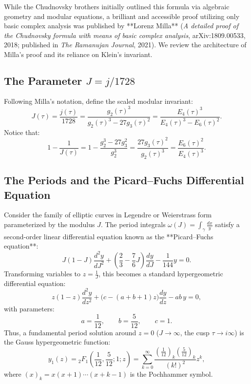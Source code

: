 \documentclass[a4paper]{article}
\begin{document}
While the Chudnovsky brothers initially outlined this formula via algebraic geometry and modular equations, a brilliant and accessible proof utilizing only basic complex analysis was published by **Lorenz Milla** (\emph{A detailed proof of the Chudnovsky formula with means of basic complex analysis}, arXiv:1809.00533, 2018; published in \emph{The Ramanujan Journal}, 2021). We review the architecture of Milla's proof and its reliance on Klein's invariant.

\subsection{The Parameter \texorpdfstring{$J = j/1728$}{J = j/1728}}
Following Milla's notation, define the scaled modular invariant:
\begin{equation}
 J(\tau) = \frac{j(\tau)}{1728} = \frac{g_2(\tau)^3}{g_2(\tau)^3 - 27g_3(\tau)^2} = \frac{E_4(\tau)^3}{E_4(\tau)^3 - E_6(\tau)^2}.
\end{equation}
Notice that:
\begin{equation}
 1 - \frac{1}{J(\tau)} = 1 - \frac{g_2^3 - 27g_3^2}{g_2^3} = \frac{27 g_3(\tau)^2}{g_2(\tau)^3} = \frac{E_6(\tau)^2}{E_4(\tau)^3}.
\end{equation}

\subsection{The Periods and the Picard--Fuchs Differential Equation}
Consider the family of elliptic curves in Legendre or Weierstrass form parameterized by the modulus $J$. The period integrals $\omega(J) = \int_\gamma \frac{dx}{y}$ satisfy a second-order linear differential equation known as the **Picard--Fuchs equation**:
\begin{equation}
 \boxed{J(1 - J) \frac{d^2 y}{dJ^2} + \left(\frac{2}{3} - \frac{7}{6}J\right) \frac{dy}{dJ} - \frac{1}{144} y = 0}.
 \label{eq:picard_fuchs}
\end{equation}
Transforming variables to $z = \frac{1}{J}$, this becomes a standard hypergeometric differential equation:
\begin{equation}
 z(1 - z) \frac{d^2 y}{dz^2} + \big(c - (a + b + 1)z\big) \frac{dy}{dz} - ab \, y = 0,
\end{equation}
with parameters:
\begin{equation}
 a = \frac{1}{12}, \qquad b = \frac{5}{12}, \qquad c = 1.
\end{equation}
Thus, a fundamental period solution around $z = 0$ ($J \to \infty$, the cusp $\tau \to i\infty$) is the Gauss hypergeometric function:
\begin{equation}
 y_1(z) = {_2F_1}\left(\frac{1}{12}, \frac{5}{12}; 1; z\right) = \sum_{k=0}^\infty \frac{\left(\frac{1}{12}\right)_k \left(\frac{5}{12}\right)_k}{(k!)^2} z^k,
\end{equation}
where $(x)_k = x(x+1)\cdots(x+k-1)$ is the Pochhammer symbol.
\end{document}

